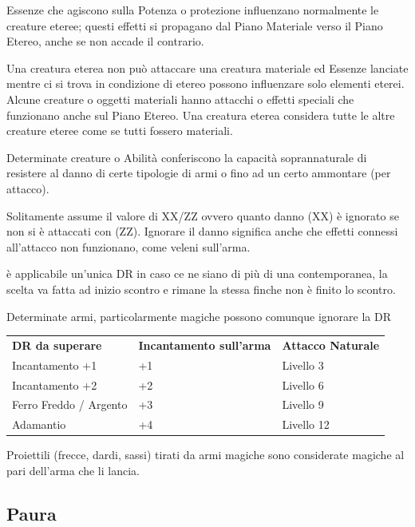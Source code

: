 \documentclass[a4paper,11pt,twoside,openany]{book}
\begin{document}
Essenze che agiscono sulla Potenza o protezione influenzano normalmente le creature eteree; questi effetti si propagano dal Piano Materiale verso il Piano Etereo, anche se non accade il contrario.

Una creatura eterea non può attaccare una creatura materiale ed Essenze lanciate mentre ci si trova in condizione di etereo possono influenzare solo elementi eterei. Alcune creature o oggetti materiali hanno attacchi o effetti speciali che funzionano anche sul Piano Etereo. Una creatura eterea considera tutte le altre creature eteree come se tutti fossero materiali.


Determinate creature o Abilità conferiscono la capacità soprannaturale di resistere al danno di certe tipologie di armi o fino ad un certo ammontare (per attacco).

Solitamente assume il valore di XX/ZZ ovvero quanto danno (XX) è ignorato se non si è attaccati con (ZZ). Ignorare il danno significa anche che effetti connessi all'attacco non funzionano, come veleni sull'arma.

è applicabile un'unica DR in caso ce ne siano di più di una contemporanea, la scelta va fatta ad inizio scontro e rimane la stessa finche non è finito lo scontro.

Determinate armi, particolarmente magiche possono comunque ignorare la DR 

\bigskip

\begin{tabular}{lll}
	\toprule
	\textbf{DR da superare} & \textbf{Incantamento sull'arma} & \textbf{Attacco Naturale}\\
	Incantamento +1         & +1              & Livello 3\\
	Incantamento +2         & +2              & Livello 6\\
	Ferro Freddo / Argento  & +3              & Livello 9\\
	Adamantio               & +4              & Livello 12\\
\end{tabular}

Proiettili (frecce, dardi, sassi) tirati da armi magiche sono considerate
magiche al pari dell'arma che li lancia.



\subsection{Paura}
\end{document}
